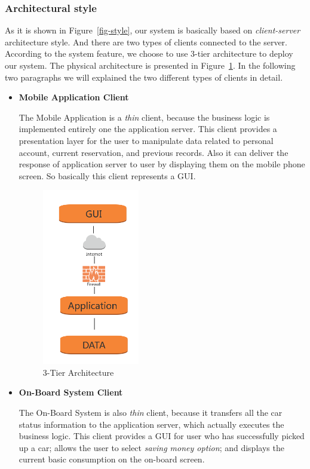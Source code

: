 \documentclass[a4paper,11pt]{article}
\begin{document}
		\subsubsection{Architectural style}
As it is shown in Figure~\ref{fig-style}, our system is basically based on \textsl{client-server} architecture style. And there are two types of clients connected to the server. According to the system feature, we choose to use 3-tier architecture to deploy our system. The physical architecture is presented in Figure~\ref{fig-tier}. In the following two paragraphs we will explained the two different types of clients in detail.	
		
			\begin{itemize}
				\item \textbf{Mobile Application Client} 
				
				The Mobile Application is a \textsl{thin} client, because the business logic is implemented entirely one the application server. This client provides a presentation layer for the user to manipulate data related to personal account, current reservation, and previous records. Also it can deliver the response of application server to user by displaying them on the mobile phone screen. So basically this client represents a GUI.

		\begin{figure}[H]
   			\centering
   			\includegraphics[width=0.4\textwidth]{images/3z_Tiers_Architecture}
  	    		\caption{3-Tier Architecture}\label{fig-tier}
		\end{figure}
						
				\item \textbf{On-Board System Client} 
				
				The On-Board System is also \textsl{thin} client, because it transfers all the car status information to the application server, which actually executes the business logic. This client provides a GUI for user who has successfully picked up a car; allows the user to select \textsl{saving money option}; and displays the current basic consumption on the on-board screen. 
			\end{itemize}				
\end{document}
